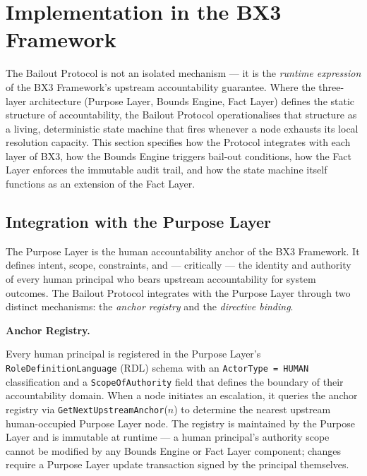 \section{Implementation in the BX3 Framework}
\label{sec:implementation}

The Bailout Protocol is not an isolated mechanism — it is the \emph{runtime expression}
of the BX3 Framework's upstream accountability guarantee. Where the three-layer
architecture (Purpose Layer, Bounds Engine, Fact Layer) defines the static structure
of accountability, the Bailout Protocol operationalises that structure as a living,
deterministic state machine that fires whenever a node exhausts its local resolution
capacity. This section specifies how the Protocol integrates with each layer of BX3,
how the Bounds Engine triggers bail-out conditions, how the Fact Layer enforces the
immutable audit trail, and how the state machine itself functions as an extension of
the Fact Layer.


\subsection{Integration with the Purpose Layer}
\label{sec:purpose-layer}

The Purpose Layer is the human accountability anchor of the BX3 Framework. It defines
intent, scope, constraints, and — critically — the identity and authority of every human
principal who bears upstream accountability for system outcomes. The Bailout Protocol
integrates with the Purpose Layer through two distinct mechanisms: the \emph{anchor
registry} and the \emph{directive binding}.

\bigskip

\noindent\textbf{Anchor Registry.}

Every human principal is registered in the Purpose Layer's \texttt{RoleDefinitionLanguage}
(RDL) schema with an \texttt{ActorType = HUMAN} classification and a
\texttt{ScopeOfAuthority} field that defines the boundary of their accountability domain.
When a node initiates an escalation, it queries the anchor registry via
\texttt{GetNextUpstreamAnchor}($n$) to determine the nearest upstream human-occupied
Purpose Layer node. The registry is maintained by the Purpose Layer and is immutable
at runtime — a human principal's authority scope cannot be modified by any Bounds Engine
or Fact Layer component; changes require a Purpose Layer update transaction signed by
the principal themselves.

